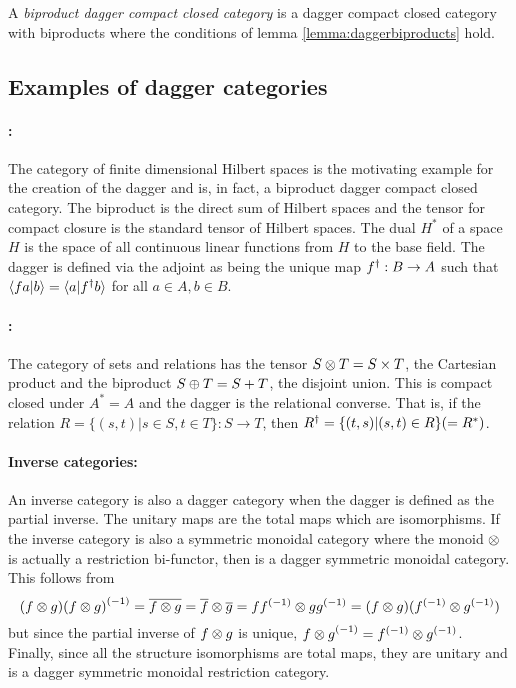 \begin{definition} \label{def:biproductdaggerccc}
  A \emph{biproduct dagger compact closed category} is a dagger compact closed category with
  biproducts where the conditions of lemma \ref{lemma:daggerbiproducts} hold.
\end{definition}
\subsection{Examples of dagger categories}

\paragraph{\fdh{}:} The category of finite dimensional Hilbert spaces is the motivating example for
the creation of the dagger and is, in fact, a biproduct dagger compact closed category. The
biproduct is the direct sum of Hilbert spaces and the tensor for compact closure is the standard
tensor of Hilbert spaces. The dual $H^{*}$ of a space $H$ is the space of all continuous linear
functions from $H$ to the base field. The dagger is defined via the adjoint as being the unique map
${f}^{\dagger}:B\to A$ such that $\langle f a|b\rangle = \langle a | {f}^{\dagger} b\rangle$ for all $a\in A, b\in B$.

\paragraph{\rel{}:} The category \rel of sets and relations has the tensor $S\otimes T = S\times T$, the
Cartesian product and the biproduct $S\oplus T = S+T$, the disjoint union. This is compact closed under
$A^{*} = A$ and the dagger is the relational converse. That is, if the relation $R=\{(s,t)|s\in S,
t\in T\}:S\to T$, then ${R}^{\dagger}=\{(t,s)|(s,t)\in R\}(=R^{*})$.

\paragraph{Inverse categories:}
An inverse category \X is also a dagger category when the dagger is defined as the partial inverse.
The unitary maps are the total maps which are isomorphisms. If the inverse category \X is also a
symmetric monoidal category where the monoid $\otimes$ is actually a restriction bi-functor, then \X is
a dagger symmetric monoidal category. This follows from
\[
  (f\otimes g) {(f\otimes g)}^{(-1)} = \overline{f\otimes g}=\overline{f} \otimes\overline{g} =
   f{f}^{(-1)} \otimes g {g}^{(-1)} = (f\otimes g) ({f}^{(-1)} \otimes {g}^{(-1)})
\]
but since the partial inverse of $f\otimes g$ is unique, ${f\otimes g}^{(-1)} = {f}^{(-1)} \otimes {g}^{(-1)}$. Finally,
since all the structure isomorphisms are total maps, they are unitary and \X is a dagger symmetric
monoidal restriction category.
